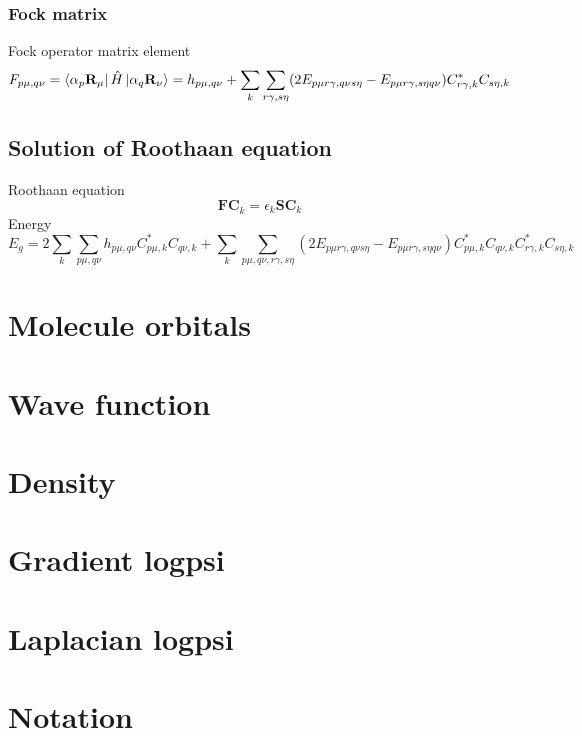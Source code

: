 \documentclass{article}
\begin{document}
        \subsubsection{Fock matrix}
            Fock operator matrix element
            \begin{equation}
                F_{p\mu,q\nu} = \bra{\alpha_p\textbf{R}_{\mu}}\hat{H}\ket{\alpha_q\textbf{R}_{\nu}} 
                = h_{p\mu,q\nu} + \sum_{k}\sum_{r\gamma,s\eta} 
                (2E_{p\mu r\gamma,q\nu s\eta}-E_{p\mu r\gamma,s\eta q\nu})C_{r\gamma,k}^*C_{s\eta,k}
            \end{equation}

    \subsection{Solution of Roothaan equation}
        Roothaan equation
        \begin{equation}
            \textbf{FC}_k = \epsilon_k\textbf{SC}_k
        \end{equation}
        Energy
        \begin{equation}
            E_g = 2\sum_k\sum_{p\mu,q\nu}h_{p\mu,q\nu}C_{p\mu,k}^*C_{q\nu,k}+
            \sum_k\sum_{p\mu,q\nu,r\gamma,s\eta}(2E_{p\mu r\gamma,q\nu s\eta}-
            E_{p\mu r\gamma,s\eta q\nu})C_{p\mu,k}^*C_{q\nu,k}C_{r\gamma,k}^*C_{s\eta,k}
        \end{equation}
        
\section{Molecule orbitals}

\section{Wave function}

\section{Density}

\section{Gradient logpsi}

\section{Laplacian logpsi}

\section*{Notation}
\end{document}
